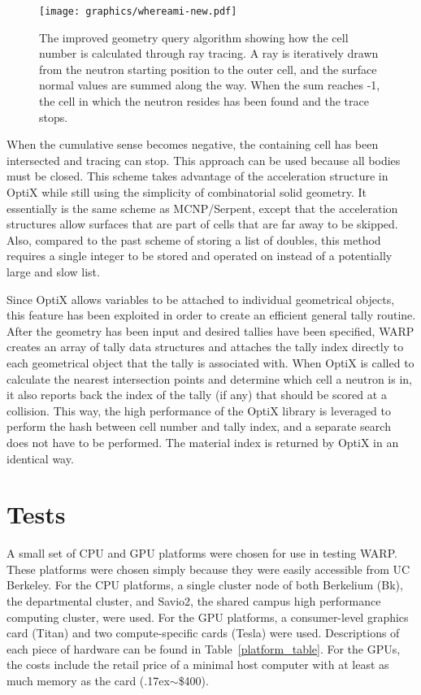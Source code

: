 \documentclass[preprint,12pt]{elsarticle}
\begin{document}
\begin{figure}[h!]
\centering
\texttt{[image: graphics/whereami-new.pdf]}
\caption{The improved geometry query algorithm showing how the cell number is calculated through ray tracing.  A ray is iteratively drawn from the neutron starting position to the outer cell, and the surface normal values are summed along the way.  When the sum reaches -1, the cell in which the neutron resides has been found and the trace stops. \label{whereami} }
\end{figure}

 When the cumulative sense becomes negative, the containing cell has been intersected and tracing can stop.  This approach can be used because all bodies must be closed.  This scheme takes advantage of the acceleration structure in OptiX while still using the simplicity of combinatorial solid geometry.  It essentially is the same scheme as MCNP/Serpent, except that the acceleration structures allow surfaces that are part of cells that are far away to be skipped.  Also, compared to the past scheme of storing a list of doubles, this method requires a single integer to be stored and operated on instead of a potentially large and slow list. 

Since OptiX allows variables to be attached to individual geometrical objects, this feature has been exploited in order to create an efficient general tally routine.  After the geometry has been input and desired tallies have been specified, WARP creates an array of tally data structures and attaches the tally index directly to each geometrical object that the tally is associated with.  When OptiX is called to calculate the nearest intersection points and determine which cell a neutron is in, it also reports back the index of the tally (if any) that should be scored at a collision.  This way, the high performance of the OptiX library is leveraged to perform the hash between cell number and tally index, and a separate search does not have to be performed.  The material index is returned by OptiX in an identical way.


\newpage
\section{Tests}
\label{sec:tests}

A small set of CPU and GPU platforms were chosen for use in testing WARP.  These platforms were chosen simply because they were easily accessible from UC Berkeley.  For the CPU platforms, a single cluster node of both Berkelium (Bk), the departmental cluster, and Savio2, the shared campus high performance computing cluster, were used.  For the GPU platforms, a consumer-level graphics card (Titan) and two compute-specific cards (Tesla) were used.  Descriptions of each piece of hardware can be found in Table~\ref{platform_table}. For the GPUs, the costs include the retail price of a minimal host computer with at least as much memory as the card ({\raise.17ex\hbox{$\scriptstyle\sim$}}\$400).
  
\end{document}
